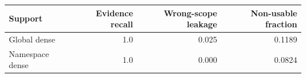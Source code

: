 \begin{tabular}{lrrr}
\toprule
Support & Evidence recall & Wrong-scope leakage & Non-usable fraction \\
\midrule
Global dense & 1.0 & 0.025 & 0.1189 \\
Namespace dense & 1.0 & 0.000 & 0.0824 \\
\bottomrule
\end{tabular}
